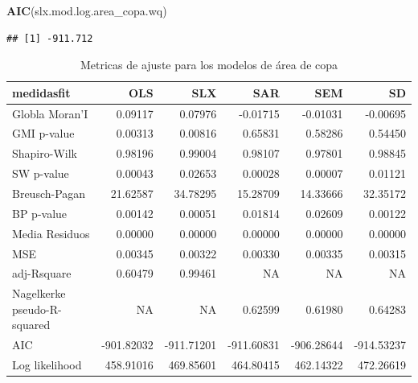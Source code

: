 \documentclass[12pt,]{book}
\newenvironment{Shaded}{\begin{snugshade}}{\end{snugshade}}
\newcommand{\KeywordTok}[1]{\textcolor[rgb]{0.13,0.29,0.53}{\textbf{#1}}}
\newcommand{\NormalTok}[1]{#1}
\begin{document}
\begin{Shaded}
\begin{Highlighting}[]
\KeywordTok{AIC}\NormalTok{(slx.mod.log.area_copa.wq)}
\end{Highlighting}
\end{Shaded}

\begin{verbatim}
## [1] -911.712
\end{verbatim}

\begin{table}

\caption{\label{tab:tabla-comp-modelos-copa}Metricas de ajuste para los modelos de área de copa}
\centering
\begin{tabular}[t]{l|r|r|r|r|r}
\hline
medidasfit & OLS & SLX & SAR & SEM & SD\\
\hline
Globla Moran'I & 0.09117 & 0.07976 & -0.01715 & -0.01031 & -0.00695\\
\hline
GMI p-value & 0.00313 & 0.00816 & 0.65831 & 0.58286 & 0.54450\\
\hline
Shapiro-Wilk & 0.98196 & 0.99004 & 0.98107 & 0.97801 & 0.98845\\
\hline
SW p-value & 0.00043 & 0.02653 & 0.00028 & 0.00007 & 0.01121\\
\hline
Breusch-Pagan & 21.62587 & 34.78295 & 15.28709 & 14.33666 & 32.35172\\
\hline
BP p-value & 0.00142 & 0.00051 & 0.01814 & 0.02609 & 0.00122\\
\hline
Media Residuos & 0.00000 & 0.00000 & 0.00000 & 0.00000 & 0.00000\\
\hline
MSE & 0.00345 & 0.00322 & 0.00330 & 0.00335 & 0.00315\\
\hline
adj-Rsquare & 0.60479 & 0.99461 & NA & NA & NA\\
\hline
Nagelkerke pseudo-R-squared & NA & NA & 0.62599 & 0.61980 & 0.64283\\
\hline
AIC & -901.82032 & -911.71201 & -911.60831 & -906.28644 & -914.53237\\
\hline
Log likelihood & 458.91016 & 469.85601 & 464.80415 & 462.14322 & 472.26619\\
\hline
\end{tabular}
\end{table}
\end{document}
